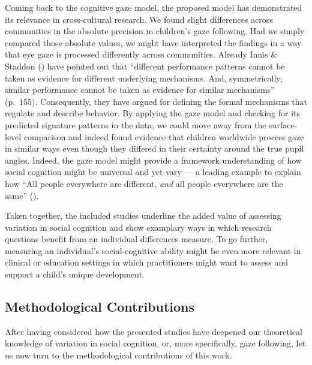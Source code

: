 \documentclass[
]{scrbook}
\begin{document}
Coming back to the cognitive gaze model, the proposed model has demonstrated its relevance in cross-cultural research. We found slight differences across communities in the absolute precision in children's gaze following. Had we simply compared those absolute values, we might have interpreted the findings in a way that eye gaze is processed differently across communities. Already Innis \& Staddon () have pointed out that ``different performance patterns cannot be taken as evidence for different underlying mechanisms. And, symmetrically, similar performance cannot be taken as evidence for similar mechanisms'' (p.~155). Consequently, they have argued for defining the formal mechanisms that regulate and describe behavior. By applying the gaze model and checking for its predicted signature patterns in the data, we could move away from the surface-level comparison and indeed found evidence that children worldwide process gaze in similar ways even though they differed in their certainty around the true pupil angles. Indeed, the gaze model might provide a framework understanding of how social cognition might be universal and yet vary --- a leading example to explain how ``All people everywhere are different, \emph{and} all people everywhere are the same'' ().

Taken together, the included studies underline the added value of assessing variation in social cognition and show examplary ways in which research questions benefit from an individual differences measure. To go further, measuring an individual's social-cognitive ability might be even more relevant in clinical or education settings in which practitioners might want to assess and support a child's unique development.

\subsection{Methodological Contributions}\label{methodological-contributions}

After having considered how the presented studies have deepened our theoretical knowledge of variation in social cognition, or, more specifically, gaze following, let us now turn to the methodological contributions of this work.
\end{document}
